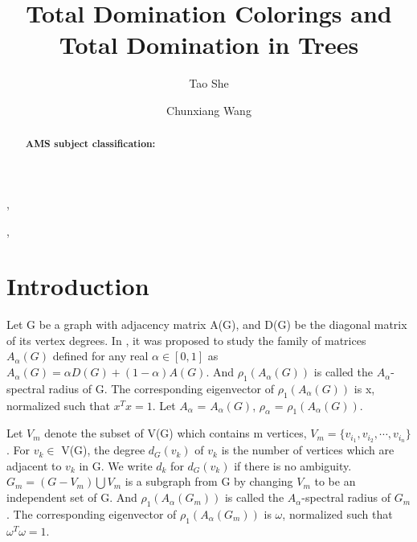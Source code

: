 \documentclass[amsthm]{elsart}
\begin{document}
\begin{frontmatter}
\title{Total Domination Colorings and Total Domination in Trees }

\journal{~~}

 \author[CW]{Tao She},
\author[CW]{Chunxiang Wang},



\address[CW]{ School of Mathematics and Statistics, Central China Normal University, Wuhan,  P.R. China}







\begin{abstract}



\vskip 2mm 
{\bf AMS subject classification:}



\end{abstract}


\end{frontmatter}

\section{Introduction}


\qquad Let G be a graph with adjacency matrix A(G), and D(G) be the diagonal matrix of its vertex degrees. In  \cite{2016Merging}, it was proposed to study the family of matrices $A_\alpha(G)$ defined for any real $\alpha\in[0,1]$ as
$A_\alpha(G) = \alpha D(G) + (1 - \alpha)A(G)$.
And
$\rho_1(A_\alpha(G))$ is called the $A_\alpha$-spectral radius of G. The corresponding eigenvector of $\rho_1(A_\alpha(G))$ is
x, normalized such that $x^{T}
x = 1$.
 Let $A_\alpha$ = $A_\alpha(G)$, $\rho_\alpha$ = $\rho_1(A_\alpha(G))$.
\par \qquad 
Let $V_m$ denote the subset
of V(G) which contains m vertices, $V_m=\{v_{i_1}, v_{i_2}, \cdots, v_{i_n}\}$. For $v_k \in$ V(G), the degree $d_G(v_k)$ of $v_k$ is the number of vertices which are adjacent to $v_k$ in G. We write $d_k$ for $d_G(v_k)$ if there
is no ambiguity.
$G_m = (G - V_m) \bigcup V_m$ is a subgraph from G by changing $V_m$ to be an independent set of G.
And
$\rho_1(A_\alpha(G_m))$ is called the $A_\alpha$-spectral radius of $G_m$. 
The corresponding eigenvector of $\rho_1(A_\alpha(G_m))$ is
$\omega$, normalized such that $\omega^{T}
\omega = 1$.
\end{document}
